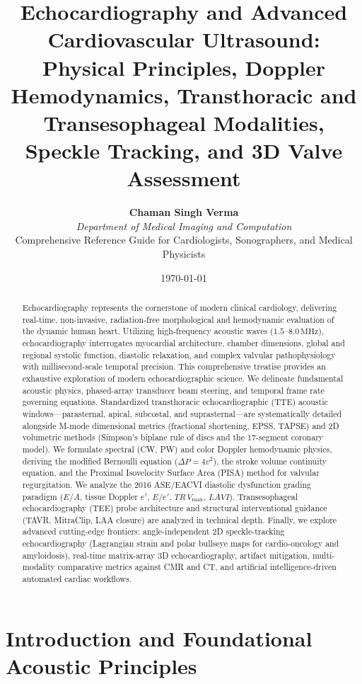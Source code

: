 \documentclass[11pt,a4paper]{article}
\title{\textbf{\huge Echocardiography and Advanced Cardiovascular Ultrasound:}\\[0.4em]
\Large Physical Principles, Doppler Hemodynamics, Transthoracic and Transesophageal Modalities, Speckle Tracking, and 3D Valve Assessment}
\author{\textbf{Chaman Singh Verma} \\
\textit{Department of Medical Imaging and Computation} \\
\small \textsf{Comprehensive Reference Guide for Cardiologists, Sonographers, and Medical Physicists}}
\date{\today}
\begin{document}
\maketitle

\begin{abstract}
Echocardiography represents the cornerstone of modern clinical cardiology, delivering real-time, non-invasive, radiation-free morphological and hemodynamic evaluation of the dynamic human heart. Utilizing high-frequency acoustic waves ($1.5\text{--}8.0\,\text{MHz}$), echocardiography interrogates myocardial architecture, chamber dimensions, global and regional systolic function, diastolic relaxation, and complex valvular pathophysiology with millisecond-scale temporal precision. This comprehensive treatise provides an exhaustive exploration of modern echocardiographic science. We delineate fundamental acoustic physics, phased-array transducer beam steering, and temporal frame rate governing equations. Standardized transthoracic echocardiographic (TTE) acoustic windows—parasternal, apical, subcostal, and suprasternal—are systematically detailed alongside M-mode dimensional metrics (fractional shortening, EPSS, TAPSE) and 2D volumetric methods (Simpson's biplane rule of discs and the 17-segment coronary model). We formulate spectral (CW, PW) and color Doppler hemodynamic physics, deriving the modified Bernoulli equation ($\Delta P = 4v^2$), the stroke volume continuity equation, and the Proximal Isovelocity Surface Area (PISA) method for valvular regurgitation. We analyze the 2016 ASE/EACVI diastolic dysfunction grading paradigm ($E/A$, tissue Doppler $e'$, $E/e'$, $TR\,V_{\text{max}}$, $LAVI$). Transesophageal echocardiography (TEE) probe architecture and structural interventional guidance (TAVR, MitraClip, LAA closure) are analyzed in technical depth. Finally, we explore advanced cutting-edge frontiers: angle-independent 2D speckle-tracking echocardiography (Lagrangian strain and polar bullseye maps for cardio-oncology and amyloidosis), real-time matrix-array 3D echocardiography, artifact mitigation, multi-modality comparative metrics against CMR and CT, and artificial intelligence-driven automated cardiac workflows.
\end{abstract}

\tableofcontents
\newpage

\section{Introduction and Foundational Acoustic Principles}
\end{document}
